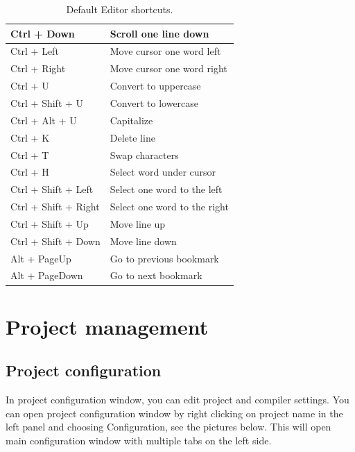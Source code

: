 \begin{table}[h!]
\begin{tabular}{|l|l|}
                    Ctrl + Down                 & Scroll one line down          \\\hline
                    Ctrl + Left                 & Move cursor one word left     \\\hline
                    Ctrl + Right                & Move cursor one word right    \\\hline
                    Ctrl + U                    & Convert to uppercase          \\\hline
                    Ctrl + Shift + U            & Convert to lowercase          \\\hline
                    Ctrl + Alt + U              & Capitalize                    \\\hline
                    Ctrl + K                    & Delete line                   \\\hline
                    Ctrl + T                    & Swap characters               \\\hline
                    Ctrl + H                    & Select word under cursor      \\\hline
                    Ctrl + Shift + Left         & Select one word to the left   \\\hline
                    Ctrl + Shift + Right        & Select one word to the right  \\\hline
                    Ctrl + Shift + Up           & Move line up                  \\\hline
                    Ctrl + Shift + Down         & Move line down                \\\hline
                    Alt + PageUp                & Go to previous bookmark       \\\hline
                    Alt + PageDown              & Go to next bookmark           \\\hline
            \end{tabular}
            \caption{Default Editor shortcuts.}
        \end{table}

\section{Project management}
    \subsection{Project configuration}
        In project configuration window, you can edit project and compiler settings. You can open project configuration
        window by right clicking on project name in the left panel and choosing Configuration, see the pictures below.
        This will open main configuration window with multiple tabs on the left side.

